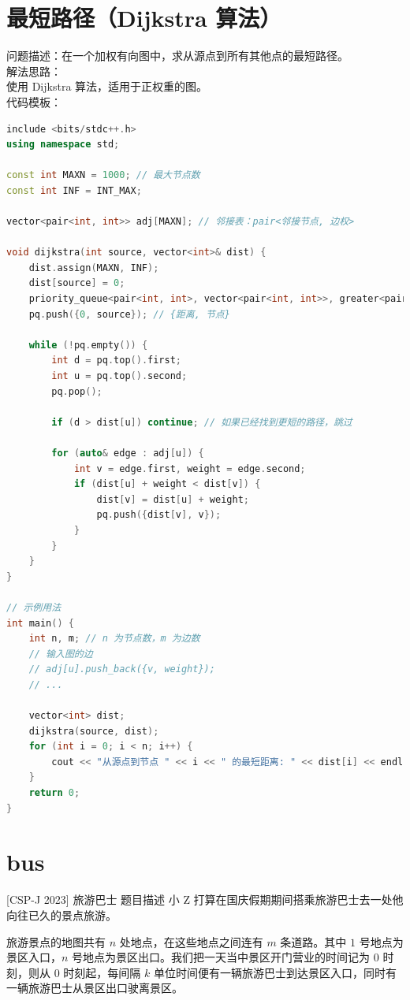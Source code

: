\documentclass[12pt,twiside,a4paper]{ctexbook}
\numberwithin{chapter}{part}
\begin{document}
\section{最短路径（Dijkstra 算法）}
问题描述：在一个加权有向图中，求从源点到所有其他点的最短路径。\\
解法思路：\\
使用 Dijkstra 算法，适用于正权重的图。\\
代码模板：
\begin{lstlisting}[language=C++]
include <bits/stdc++.h>
using namespace std;

const int MAXN = 1000; // 最大节点数
const int INF = INT_MAX;

vector<pair<int, int>> adj[MAXN]; // 邻接表：pair<邻接节点, 边权>

void dijkstra(int source, vector<int>& dist) {
    dist.assign(MAXN, INF);
    dist[source] = 0;
    priority_queue<pair<int, int>, vector<pair<int, int>>, greater<pair<int, int>>> pq;
    pq.push({0, source}); // {距离, 节点}

    while (!pq.empty()) {
        int d = pq.top().first;
        int u = pq.top().second;
        pq.pop();

        if (d > dist[u]) continue; // 如果已经找到更短的路径，跳过

        for (auto& edge : adj[u]) {
            int v = edge.first, weight = edge.second;
            if (dist[u] + weight < dist[v]) {
                dist[v] = dist[u] + weight;
                pq.push({dist[v], v});
            }
        }
    }
}

// 示例用法
int main() {
    int n, m; // n 为节点数，m 为边数
    // 输入图的边
    // adj[u].push_back({v, weight});
    // ...
    
    vector<int> dist;
    dijkstra(source, dist);
    for (int i = 0; i < n; i++) {
        cout << "从源点到节点 " << i << " 的最短距离: " << dist[i] << endl;
    }
    return 0;
}
\end{lstlisting}

\section{bus}
 [CSP-J 2023] 旅游巴士
 题目描述
小 Z 打算在国庆假期期间搭乘旅游巴士去一处他向往已久的景点旅游。

旅游景点的地图共有 $n$ 处地点，在这些地点之间连有 $m$ 条道路。其中 $1$ 号地点为景区入口，$n$ 号地点为景区出口。我们把一天当中景区开门营业的时间记为 $0$ 时刻，则从 $0$ 时刻起，每间隔 $k$ 单位时间便有一辆旅游巴士到达景区入口，同时有一辆旅游巴士从景区出口驶离景区。
\end{document}
